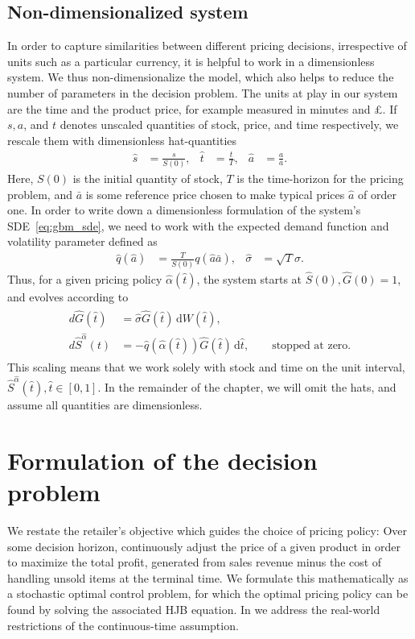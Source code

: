 \documentclass[main.tex]{subfiles}
\begin{document}
\subsection{Non-dimensionalized system}\label{subsec:nondimensionalization}
In order to capture similarities between different pricing decisions, irrespective of units
such as a particular currency, it is helpful to work in a dimensionless system.
We thus non-dimensionalize the model, which also helps to reduce the
number of parameters in the decision problem.
The units at play in our system are the time and the product price,
for example measured in minutes and \pounds.
If $s,a$, and $t$ denotes unscaled quantities of stock, price, and
time respectively, we rescale them with dimensionless hat-quantities
\begin{align}
  \hat s&=\frac{s}{S(0)},&\hat t &=\frac{t}{T},
  &\hat a &= \frac{a}{\bar a}.
\end{align}
Here, $S(0)$ is the initial quantity of stock, $T$ is the time-horizon
for the pricing problem, and $\bar a$ is some reference price chosen
to make typical prices $\hat a$ of order one.
In order to write down a dimensionless formulation of the system's
SDE~\eqref{eq:gbm_sde}, we need to work with the expected demand
function and volatility parameter defined as
\begin{align}
  \hat q(\hat a)&=\frac{T}{S(0)}q(\hat a \bar a),
  &\hat \sigma &= \sqrt{T}\sigma.
\end{align}
Thus, for a given pricing policy $\hat \alpha(\hat t)$, the
system starts at $\hat S(0),\hat G(0)=1$, and evolves according to
\begin{align}
  \begin{split}\label{eq:gbm_sde_nondim}
    d\hat G(\hat t)&=\hat \sigma \hat G(\hat t)\,\mathrm{d}W(\hat t),\\
    d\hat S^{\hat \alpha}(t)&=-\hat q(\hat \alpha(\hat t))\hat G(\hat
    t)\,\mathrm{d}\hat t,\qquad\text{stopped at zero}.
  \end{split}
\end{align}
This scaling means that we work solely with stock and time on the unit interval, $\hat S^{\hat \alpha}(\hat t),\hat t\in[0,1]$.
In the remainder of the chapter, we will omit the hats, and assume all
quantities are dimensionless.

\section{Formulation of the decision
  problem}\label{sec:decision_formulation}
We restate the retailer's objective which
guides the choice of pricing policy: Over some decision horizon, continuously
adjust the price of a given product in order to maximize
the total profit, generated from sales revenue minus the cost of handling
unsold items at the terminal time. We formulate this mathematically as
a stochastic optimal control problem, for which the optimal pricing
policy can be found by solving the associated HJB equation.
In  we address the real-world restrictions of
the continuous-time assumption.
\end{document}
